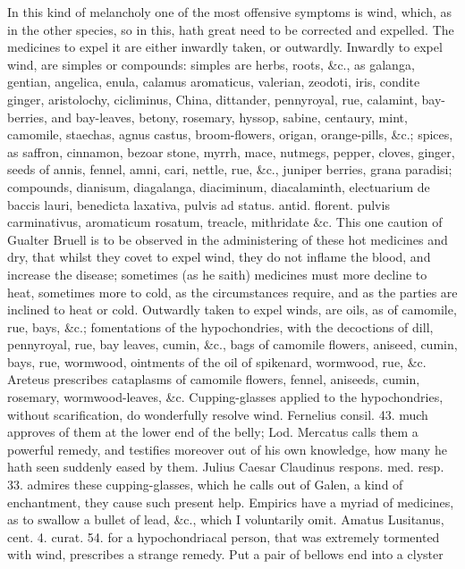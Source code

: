 In this kind of melancholy one of the most offensive symptoms is wind,
which, as in the other species, so in this, hath great need to be
corrected and expelled.
The medicines to expel it are either inwardly taken, or outwardly.
Inwardly to expel wind, are simples or compounds: simples are herbs,
roots, \&c., as galanga, gentian, angelica, enula, calamus aromaticus,
valerian, zeodoti, iris, condite ginger, aristolochy, cicliminus,
China, dittander, pennyroyal, rue, calamint, bay-berries, and
bay-leaves, betony, rosemary, hyssop, sabine, centaury, mint, camomile,
staechas, agnus castus, broom-flowers, origan, orange-pills, \&c.;
spices, as saffron, cinnamon, bezoar stone, myrrh, mace, nutmegs,
pepper, cloves, ginger, seeds of annis, fennel, amni, cari, nettle,
rue, \&c., juniper berries, grana paradisi; compounds, dianisum,
diagalanga, diaciminum, diacalaminth, electuarium de baccis lauri,
benedicta laxativa, pulvis ad status. antid. florent. pulvis
carminativus, aromaticum rosatum, treacle, mithridate \&c. This one
caution of Gualter Bruell is to be observed in the administering
of these hot medicines and dry, that whilst they covet to expel wind,
they do not inflame the blood, and increase the disease; sometimes (as
he saith) medicines must more decline to heat, sometimes more to cold,
as the circumstances require, and as the parties are inclined to heat
or cold.
Outwardly taken to expel winds, are oils, as of camomile, rue, bays,
\&c.; fomentations of the hypochondries, with the decoctions of dill,
pennyroyal, rue, bay leaves, cumin, \&c., bags of camomile flowers,
aniseed, cumin, bays, rue, wormwood, ointments of the oil of spikenard,
wormwood, rue, \&c. Areteus prescribes cataplasms of camomile
flowers, fennel, aniseeds, cumin, rosemary, wormwood-leaves, \&c.
Cupping-glasses applied to the hypochondries, without
scarification, do wonderfully resolve wind. Fernelius consil. 43. much
approves of them at the lower end of the belly; Lod. Mercatus
calls them a powerful remedy, and testifies moreover out of his own
knowledge, how many he hath seen suddenly eased by them. Julius Caesar
Claudinus respons. med. resp. 33. admires these cupping-glasses, which
he calls out of Galen, a kind of enchantment, they cause such
present help.
Empirics have a myriad of medicines, as to swallow a bullet of lead,
\&c., which I voluntarily omit. Amatus Lusitanus, cent. 4. curat. 54.
for a hypochondriacal person, that was extremely tormented with wind,
prescribes a strange remedy. Put a pair of bellows end into a clyster
